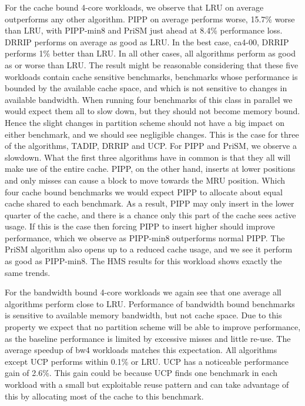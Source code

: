 For the cache bound 4-core workloads, we observe that LRU on average outperforms any other algorithm. 
PIPP on average performs worse, 15.7\% worse than LRU, with PIPP-min8 and PriSM just ahead at 8.4\% performance loss.
DRRIP performs on average as good as LRU. 
In the best case, ca4-00, DRRIP performs 1\% better than LRU.
In all other cases, all algorithms perform as good as or worse than LRU.
The result might be reasonable considering that these five workloads contain cache sensitive benchmarks, benchmarks whose performance is bounded by the available cache space, and which is not sensitive to changes in available bandwidth.
When running four benchmarks of this class in parallel we would expect them all to slow down, but they should not become memory bound.
Hence the slight changes in partition scheme should not have a big impact on either benchmark, and we should see negligible changes.
This is the case for three of the algorithms, TADIP, DRRIP and UCP.
For PIPP and PriSM, we observe a slowdown.
What the first three algorithms have in common is that they all will make use of the entire cache.
PIPP, on the other hand, inserts at lower positions and only misses can cause a block to move towards the MRU position.
Which four cache bound benchmarks we would expect PIPP to allocate about equal cache shared to each benchmark. 
As a result, PIPP may only insert in the lower quarter of the cache, and there is a chance only this part of the cache sees active usage.
If this is the case then forcing PIPP to insert higher should improve performance, which we observe as PIPP-min8 outperforms normal PIPP.
The PriSM algorithm also opens up to a reduced cache usage, and we see it perform as good as PIPP-min8.
The HMS results for this workload shows exactly the same trends.

For the bandwidth bound 4-core workloads we again see that one average all algorithms perform close to LRU.
Performance of bandwidth bound benchmarks is sensitive to available memory bandwidth, but not cache space. 
Due to this property we expect that no partition scheme will be able to improve performance, as the baseline performance is limited by excessive misses and little re-use.
The average speedup of bw4 workloads matches this expectation.
All algorithms except UCP performs within 0.1\% or LRU.
UCP has a noticeable performance gain of 2.6\%. 
This gain could be because UCP finds one benchmark in each workload with a small but exploitable reuse pattern and can take advantage of this by allocating most of the cache to this benchmark. 

